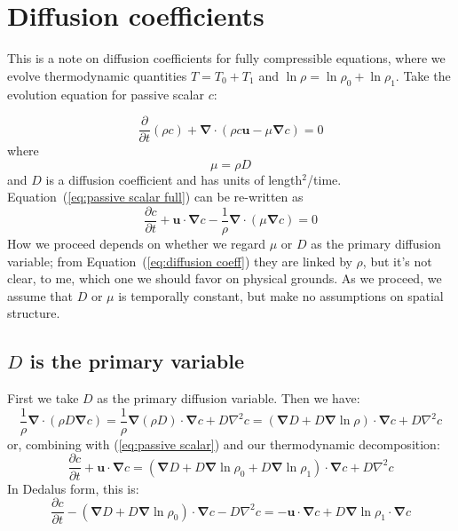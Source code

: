 \documentclass[letterpaper,12pt]{paper}
\newcommand{\del}{\ensuremath{\mathbf{\nabla}}}
\renewcommand{\vec}[1]{\ensuremath{\mathbf{#1}}}
\begin{document}
\section{Diffusion coefficients}
\label{sec:equations}

This is a note on diffusion coefficients for fully compressible equations, where we evolve thermodynamic quantities $T=T_0+T_1$ and $\ln \rho = \ln \rho_0 + \ln \rho_1$.
Take the evolution equation for passive scalar $c$:

\begin{equation}
\frac{\partial}{\partial t} (\rho c) + \del \cdot \left( \rho c \vec{u} - \mu \del c \right) = 0
\label{eq:passive scalar full}
\end{equation}
where
\begin{equation}
\mu = \rho D
\label{eq:diffusion coeff}
\end{equation}
and $D$ is a diffusion coefficient and has units of length$^2$/time.  Equation~(\ref{eq:passive scalar full}) can be re-written as
\begin{equation}
\frac{\partial c}{\partial t} + \vec{u}\cdot\del c - \frac{1}{\rho} \del \cdot \left(\mu\del c\right) = 0
\label{eq:passive scalar}
\end{equation}
How we proceed depends on whether we regard $\mu$ or $D$ as the primary diffusion variable; from Equation~(\ref{eq:diffusion coeff}) they are linked by $\rho$, but it's not clear, to me, which one we should favor on physical grounds.  As we proceed, we assume that $D$ or $\mu$ is temporally constant, but make no assumptions on spatial structure.

\subsection{$D$ is the primary variable}
First we take $D$ as the primary diffusion variable.  Then we have:
\begin{equation}
\frac{1}{\rho} \del \cdot \left(\rho D \del c\right) 
= \frac{1}{\rho} \del \left(\rho D\right) \cdot \del c + D \nabla^2 c 
=  \left(\del D + D \del \ln \rho\right)\cdot \del c + D \nabla^2 c
\label{eq: diffusion equalities}
\end{equation}
or, combining with (\ref{eq:passive scalar}) and our thermodynamic decomposition:
\begin{equation}
\frac{\partial c}{\partial t} + \vec{u}\cdot\del c = \left(\del D + D \del \ln \rho_0 + D\del \ln \rho_1\right)\cdot \del c + D \nabla^2 c
\end{equation}
In Dedalus form, this is:
\begin{equation}
\frac{\partial c}{\partial t} - (\del D + D\del \ln \rho_0) \cdot \del c - D \nabla^2 c = -\vec{u}\cdot\del c + D\del \ln \rho_1 \cdot \del c
\end{equation}
\end{document}
